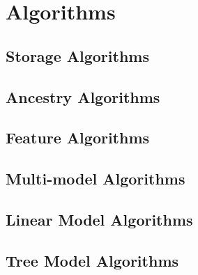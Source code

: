 \chapter{Algorithms}

\section{Storage Algorithms}

\section{Ancestry Algorithms}

\section{Feature Algorithms}

\section{Multi-model Algorithms}

\section{Linear Model Algorithms}

\section{Tree Model Algorithms}
